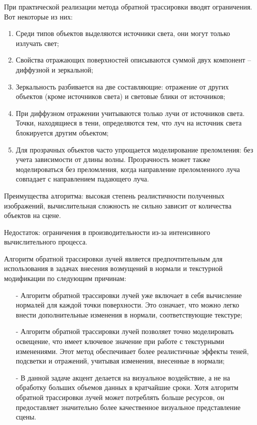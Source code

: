 При практической реализации метода обратной трассировки вводят ограничения. Вот некоторые из них:
\begin{enumerate}[label=\arabic*)]
	\item Среди типов объектов выделяются источники света, они могут только излучать свет;
	\item Свойства отражающих поверхностей описываются суммой двух компонент -- диффузной и зеркальной;
	\item Зеркальность разбивается на две составляющие: отражение от других объектов (кроме источников света) и световые блики от источников;
	\item При диффузном отражении учитываются только лучи от источников света. Точки, находящиеся в тени, определяются тем, что луч на источник света блокируется другим объектом;
	\item Для прозрачных объектов часто упрощается моделирование преломления: без учета зависимости от длины волны. Прозрачность может также моделироваться без преломления, когда направление преломленного луча совпадает с направлением падающего луча.
\end{enumerate}

Преимущества алгоритма: высокая степень реалистичности полученных изображений, вычислительная сложность не сильно зависит от количества объектов на сцене.

Недостаток: ограничения в производительности из-за интенсивного вычислительного процесса.

Алгоритм обратной трассировки лучей является предпочтительным для использования в задачах внесения возмущений в нормали и текстурной модификации по следующим причинам:
\begin{itemize}[label=\arabic*)]
	\item[-] Алгоритм обратной трассировки лучей уже включает в себя вычисление нормалей для каждой точки поверхности. Это означает, что можно легко внести дополнительные изменения в нормали, соответствующие текстуре;
	\item[-] Алгоритм обратной трассировки лучей позволяет точно моделировать освещение, что имеет ключевое значение при работе с текстурными изменениями. Этот метод обеспечивает более реалистичные эффекты теней, подсветки и отражений, учитывая изменения, внесенные в нормали;
	\item[-] В данной задаче акцент делается на визуальное воздействие, а не на обработку больших объемов данных в кратчайшие сроки. Хотя алгоритм обратной трассировки лучей может потреблять больше ресурсов, он предоставляет значительно более качественное визуальное представление сцены.
\end{itemize}

